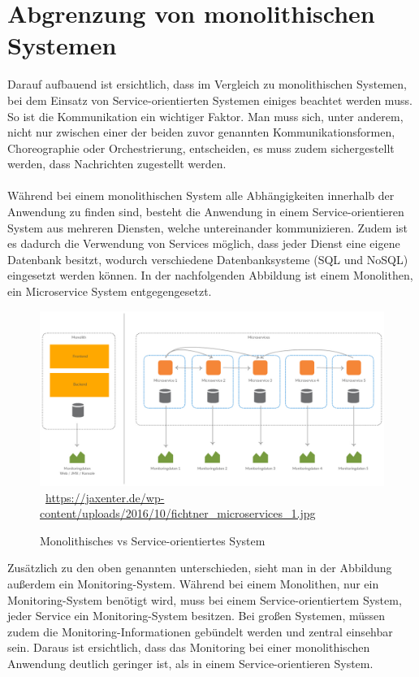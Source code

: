 \section{Abgrenzung von monolithischen Systemen}
\label{sec:AbgrenzungVonMonolithischenSystemen}
Darauf aufbauend ist ersichtlich, dass im Vergleich zu monolithischen Systemen, bei dem Einsatz von Service-orientierten Systemen einiges beachtet werden muss. So ist die Kommunikation ein wichtiger Faktor. Man muss sich, unter anderem, nicht nur zwischen einer der beiden zuvor genannten Kommunikationsformen, Choreographie oder Orchestrierung, entscheiden, es muss zudem sichergestellt werden, dass Nachrichten zugestellt werden.
\\\\
Während bei einem monolithischen System alle Abhängigkeiten innerhalb der Anwendung zu finden sind, besteht die Anwendung in einem Service-orientieren System aus mehreren Diensten, welche untereinander kommunizieren. Zudem ist es dadurch die Verwendung von Services möglich, dass jeder Dienst eine eigene Datenbank besitzt, wodurch verschiedene Datenbanksysteme (SQL und NoSQL) eingesetzt werden können. In der nachfolgenden Abbildung ist einem Monolithen, ein Microservice System entgegengesetzt.
\begin{figure}[htb]
    \centering 
    \includegraphics[width=\linewidth]{content/images/fichtner_microservices_1}\
    \quelle\url{https://jaxenter.de/wp-content/uploads/2016/10/fichtner_microservices_1.jpg}
    \caption{Monolithisches vs Service-orientiertes System}
    \label{fig:BoundedContext}  
\end{figure}
Zusätzlich zu den oben genannten unterschieden, sieht man in der Abbildung außerdem ein Monitoring-System. Während bei einem Monolithen, nur ein Monitoring-System benötigt wird, muss bei einem Service-orientiertem System, jeder Service ein Monitoring-System besitzen. Bei großen Systemen, müssen zudem die Monitoring-Informationen gebündelt werden und zentral einsehbar sein. Daraus ist ersichtlich, dass das Monitoring bei einer monolithischen Anwendung deutlich geringer ist, als in einem Service-orientieren System.